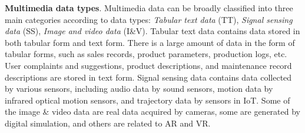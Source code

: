 \documentclass[a4paper,fleqn]{cas-dc}
\begin{document}
\textbf{Multimedia data types}. Multimedia data can be broadly classified into three main categories according to data types: \textit{Tabular text data} (TT), \textit{Signal sensing data} (SS), \textit{Image and video data} (I\&V).
Tabular text data contains data stored in both tabular form and text form.
There is a large amount of data in the form of tabular forms, such as sales records, product parameters, production logs, etc. User complaints and suggestions, product descriptions, and maintenance record descriptions are stored in text form.
Signal sensing data contains data collected by various sensors, including audio data by sound sensors, motion data by infrared optical motion sensors, and trajectory data by sensors in IoT.
Some of the image \& video data are real data acquired by cameras, some are generated by digital simulation, and others are related to AR and VR.
\end{document}
